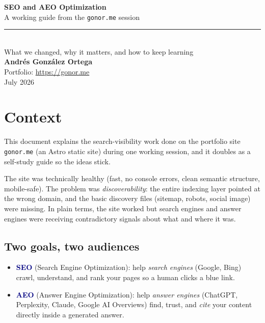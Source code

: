 \documentclass[11pt]{article}
\newcommand{\term}[1]{\textcolor{navy}{\textbf{#1}}}
\begin{document}
\begin{titlepage}
\centering
\vspace*{3cm}
{\color{navy}\Huge\bfseries SEO and AEO Optimization}\\[0.4cm]
{\color{terracotta}\Large A working guide from the \texttt{gonor.me} session}\\[1.2cm]
{\color{sage}\rule{0.5\textwidth}{1.5pt}}\\[1.2cm]
{\large What we changed, why it matters, and how to keep learning}\\[3cm]
{\large\textbf{Andr\'es Gonz\'alez Ortega}}\\[0.2cm]
{\normalsize Portfolio: \url{https://gonor.me}}\\[0.2cm]
{\normalsize July 2026}
\vfill
\end{titlepage}

\tableofcontents
\newpage

\section{Context}

This document explains the search-visibility work done on the portfolio site
\texttt{gonor.me} (an Astro static site) during one working session, and it
doubles as a self-study guide so the ideas stick.

The site was technically healthy (fast, no console errors, clean semantic
structure, mobile-safe). The problem was \emph{discoverability}: the entire
indexing layer pointed at the wrong domain, and the basic discovery files
(sitemap, robots, social image) were missing. In plain terms, the site worked
but search engines and answer engines were receiving contradictory signals
about what and where it was.

\subsection{Two goals, two audiences}

\begin{itemize}[leftmargin=1.4em]
  \item \term{SEO} (Search Engine Optimization): help \emph{search engines}
  (Google, Bing) crawl, understand, and rank your pages so a human clicks a
  blue link.
  \item \term{AEO} (Answer Engine Optimization): help \emph{answer engines}
  (ChatGPT, Perplexity, Claude, Google AI Overviews) find, trust, and
  \emph{cite} your content directly inside a generated answer.
\end{itemize}
\end{document}
